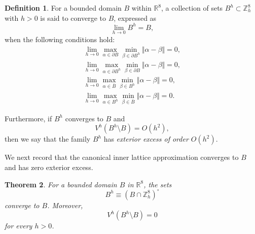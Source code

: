 \documentclass{amsart}
\newtheorem{theorem}{Theorem}[section]
\theoremstyle{definition}
\newtheorem{definition}[theorem]{Definition}
\theoremstyle{remark}
\numberwithin{equation}{section}
\newcommand{\R}{\mathbb{R}}
\newcommand{\p}{\partial}
\newcommand{\Z}{\mathbb Z}
\begin{document}
\begin{definition}\label{2023-09-11 10:00:54}
For a bounded domain $B$ within $\R^8$,	
	a collection of sets $B^h\subset \Z_h^8$ with $h>0$ is said to converge to $B$, expressed as
   \[
\lim_{h\to 0} B^h= B,
\] when the following conditions hold:
    \begin{equation}
        \begin{aligned}
            \lim_{h\to 0} \max_{\alpha\in \p B }\min_{\beta\in \p B^h} \Vert \alpha-\beta\Vert=0,\\
            \lim_{h\to  0} \max_{\alpha\in \p B^h }\min_{\beta\in \p B } \Vert \alpha-\beta\Vert=0,\\
            \lim_{h\to  0} \max_{\alpha\in \overline B}\min_{\beta\in B^h } \Vert \alpha-\beta\Vert=0,\\
            \lim_{h\to  0} \max_{\alpha\in B^h }\min_{\beta\in \overline B } \Vert \alpha-\beta\Vert=0.
        \end{aligned}
    \end{equation}

Furthermore, if $B^h$ converges to $B$ and
\[
V^h(B^h\setminus B) = O(h^2),
\]
then we say that the family $B^h$ has \emph{exterior excess of order $O(h^2)$}.
\end{definition}



We next record that the canonical inner lattice approximation converges to $B$ and has zero exterior excess.

\begin{theorem}
	For a bounded domain  $B$ in $\R^8$, the sets
  \[
B^h \equiv (B \cap \Z_h^8)^\circ
\] converge to $B$. Moreover,
  \[
V^h(B^h\setminus B)=0
\]
  for every $h>0$.
\end{theorem}
\end{document}
